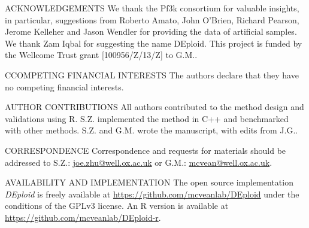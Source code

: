 \documentclass{nature}
\begin{document}
\begin{addendum}
 \item[ACKNOWLEDGEMENTS] We thank the Pf3k consortium for valuable insights, in particular, suggestions from Roberto Amato, John O'Brien, Richard Pearson, Jerome Kelleher and Jason Wendler for providing the data of artificial samples. We thank Zam Iqbal for suggesting the name DEploid. This project is funded by the Wellcome Trust grant [100956/Z/13/Z] to G.M..
 \item[CCOMPETING FINANCIAL INTERESTS] The authors declare that they have no competing financial interests.
 \item[AUTHOR CONTRIBUTIONS] All authors contributed to the method design and validations using R. S.Z. implemented the method in C++ and benchmarked with other methods. S.Z. and G.M. wrote the manuscript, with edits from J.G..
 \item[CORRESPONDENCE] Correspondence and requests for materials should be addressed to S.Z.: \href{joe.zhu@well.ox.ac.uk}{joe.zhu@well.ox.ac.uk} or G.M.: \href{mcvean@well.ox.ac.uk}{mcvean@well.ox.ac.uk}.
 \item[AVAILABILITY AND IMPLEMENTATION] The open source implementation {\it DEploid} is freely available at \href{https://github.com/mcveanlab/DEploid}{https://github.com/mcveanlab/DEploid} under the conditions of the GPLv3 license.
An R version is available at \href{https://github.com/mcveanlab/DEploid-r}{https://github.com/mcveanlab/DEploid-r}.\\

\end{addendum}


%
\end{document}
